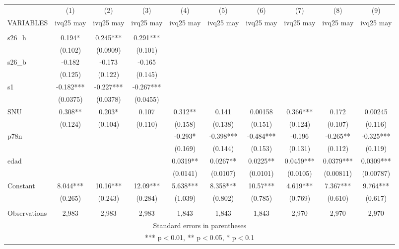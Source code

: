 \begin{tabular}{lccccccccc} \hline
 & (1) & (2) & (3) & (4) & (5) & (6) & (7) & (8) & (9) \\
VARIABLES & ivq25 may & ivq25 may & ivq25 may & ivq25 may & ivq25 may & ivq25 may & ivq25 may & ivq25 may & ivq25 may \\ \hline
 &  &  &  &  &  &  &  &  &  \\
s26\_h & 0.194* & 0.245*** & 0.291*** &  &  &  &  &  &  \\
 & (0.102) & (0.0909) & (0.101) &  &  &  &  &  &  \\
s26\_b & -0.182 & -0.173 & -0.165 &  &  &  &  &  &  \\
 & (0.125) & (0.122) & (0.145) &  &  &  &  &  &  \\
s1 & -0.182*** & -0.227*** & -0.267*** &  &  &  &  &  &  \\
 & (0.0375) & (0.0378) & (0.0455) &  &  &  &  &  &  \\
SNU & 0.308** & 0.203* & 0.107 & 0.312** & 0.141 & 0.00158 & 0.366*** & 0.172 & 0.00245 \\
 & (0.124) & (0.104) & (0.110) & (0.158) & (0.138) & (0.151) & (0.124) & (0.107) & (0.116) \\
p78n &  &  &  & -0.293* & -0.398*** & -0.484*** & -0.196 & -0.265** & -0.325*** \\
 &  &  &  & (0.169) & (0.144) & (0.153) & (0.131) & (0.112) & (0.119) \\
edad &  &  &  & 0.0319** & 0.0267** & 0.0225** & 0.0459*** & 0.0379*** & 0.0309*** \\
 &  &  &  & (0.0141) & (0.0107) & (0.0101) & (0.0105) & (0.00811) & (0.00787) \\
Constant & 8.044*** & 10.16*** & 12.09*** & 5.638*** & 8.358*** & 10.57*** & 4.619*** & 7.367*** & 9.764*** \\
 & (0.265) & (0.243) & (0.284) & (1.039) & (0.802) & (0.785) & (0.769) & (0.610) & (0.617) \\
 &  &  &  &  &  &  &  &  &  \\
 Observations & 2,983 & 2,983 & 2,983 & 1,843 & 1,843 & 1,843 & 2,970 & 2,970 & 2,970 \\ \hline
\multicolumn{10}{c}{ Standard errors in parentheses} \\
\multicolumn{10}{c}{ *** p$<$0.01, ** p$<$0.05, * p$<$0.1} \\
\end{tabular}
